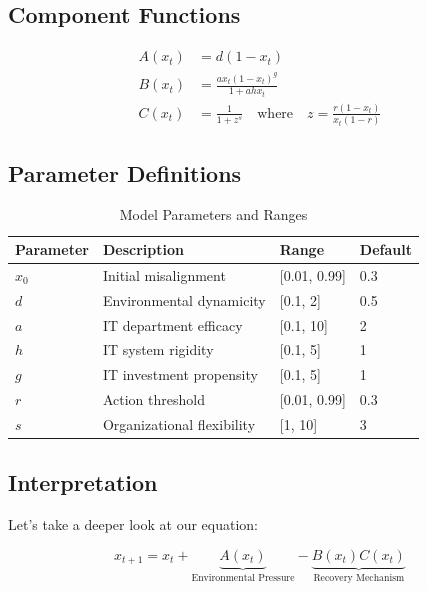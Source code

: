 \documentclass[a4paper, 10pt]{article}
\begin{document}
\subsection{Component Functions}
\begin{align}
	A(x_t) & = d(1 - x_t)                                                                     \\
	B(x_t) & = \frac{a x_t (1 - x_t)^g}{1 + a h x_t}                                          \\
	C(x_t) & = \frac{1}{1 + z^s} \quad \text{where} \quad z = \frac{r (1 - x_t)}{x_t (1 - r)}
\end{align}

\subsection{Parameter Definitions}
\begin{table}[h]
	\centering
	\caption{Model Parameters and Ranges}
	\begin{tabular}{llll}
		\toprule
		\textbf{Parameter} & \textbf{Description}       & \textbf{Range} & \textbf{Default} \\
		\midrule
		$x_0$              & Initial misalignment       & [0.01, 0.99]   & 0.3              \\
		$d$                & Environmental dynamicity   & [0.1, 2]       & 0.5              \\
		$a$                & IT department efficacy     & [0.1, 10]      & 2                \\
		$h$                & IT system rigidity         & [0.1, 5]       & 1                \\
		$g$                & IT investment propensity   & [0.1, 5]       & 1                \\
		$r$                & Action threshold           & [0.01, 0.99]   & 0.3              \\
		$s$                & Organizational flexibility & [1, 10]        & 3                \\
		\bottomrule
	\end{tabular}
\end{table}

\subsection{Interpretation}
Let's take a deeper look at our equation:

\begin{equation}
	x_{t + 1} = x_t + \underbrace{A(x_t)}_{\text{Environmental Pressure}} - \underbrace{B(x_t)C(x_t)}_{\text{Recovery Mechanism}}
\end{equation}
\end{document}
